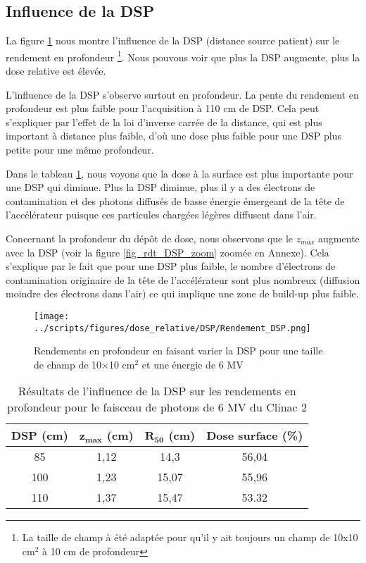 \documentclass{book}
\begin{document}
\subsection{Influence de la DSP}

La figure \ref*{fig_rdt_dsp} nous montre l'influence de la DSP (distance source patient) sur le rendement en profondeur \footnote{La taille de champ à été adaptée pour qu'il y ait toujours un champ de 10x10 cm$^2$ à 10 cm de profondeur}. Nous pouvons voir que plus la DSP augmente, plus la dose relative est élevée.

L'influence de la DSP s'observe surtout en profondeur. La pente du rendement en profondeur est plus faible pour l'acquisition à 110 cm de DSP. Cela peut s'expliquer par l'effet de la loi d'inverse carrée de la distance, qui est plus important à distance plus faible, d'où une dose plus faible pour une DSP plus petite pour une même profondeur. 

Dans le tableau \ref*{table_rdt_dsp}, nous voyons que la dose à la surface est plus importante pour une DSP qui diminue. Plus la DSP diminue, plus il y a des électrons de contamination et des photons diffusés de basse énergie émergeant de la tête de l'accélérateur puisque ces particules chargées légères diffusent dans l'air.

Concernant la profondeur du dépôt de dose, nous observons que le $z_{max}$ augmente avec la DSP (voir la figure \ref*{fig_rdt_DSP_zoom} zoomée en Annexe). Cela s'explique par le fait que pour une DSP plus faible, le nombre d'électrons de contamination originaire de la tête de l'accélérateur sont plus nombreux (diffusion moindre des électrons dans l'air) ce qui implique une zone de build-up plus faible.

\begin{figure}[h]
  \centering
  \texttt{[image: ../scripts/figures/dose\_relative/DSP/Rendement\_DSP.png]}
  \caption{Rendements en profondeur en faisant varier la DSP pour une taille de champ de 10$\times$10 cm$^2$ et une énergie de 6 MV}
  \label{fig_rdt_dsp}
\end{figure}

\begin{table}[h]
  \centering
  \begin{tabular}{cccc}
    \toprule
    \textbf{DSP (cm)} & $\mathbf{z_{max}}$ \textbf{(cm)} & $\mathbf{R_{50}}$ \textbf{(cm)} & \textbf{Dose surface (\%)} \\
    \toprule
    85 & 1,12 & 14,3 & 56,04 \\
    100 & 1,23 & 15,07 & 55,96 \\
    110 & 1,37 & 15,47 & 53.32 \\
    \bottomrule
  \end{tabular}
  \caption{Résultats de l'influence de la DSP sur les rendements en profondeur pour le faisceau de photons de 6 MV du Clinac 2}
  \label{table_rdt_dsp}
\end{table}
\end{document}

